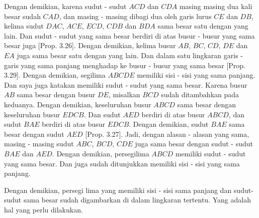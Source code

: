 \documentclass[a4paper]{book}
\begin{document}
Dengan demikian, karena sudut - sudut $ACD$ dan $CDA$ masing masing dua kali
besar  sudah $CAD$, dan masing - masing dibagi dua oleh garis lurus $CE$ dan 
$DB$, kelima sudut $DAC$, $ACE$, $ECD$, $CDB$ dan $BDA$ sama besar satu
dengan yang lain. Dan sudut - sudut yang sama besar berdiri di atas busur -
busur yang sama besar juga [Prop. 3.26]. Dengan demikian, kelima busur $AB$, 
$BC$, $CD$, $DE$ dan $EA$ juga sama besar satu dengan yang lain. Dan dalam 
satu lingkaran garis - garis yang sama panjang menghadap ke busur - busur yang
sama besar [Prop. 3.29].
Dengan demikian, segilima $ABCDE$ memiliki sisi - sisi yang sama panjang. Dan
saya juga katakan memiliki sudut - sudut yang sama besar. Karena busur $AB$ 
sama besar dengan busur $DE$, misalkan $BCD$ sudah ditambahkan pada keduanya.
Dengan demikian, keseluruhan busur $ABCD$ sama besar dengan keseluruhan 
busur $EDCB$.  Dan sudut $AED$ berdiri di atas busur $ABCD$, dan sudut $BAE$
berdiri di atas busur $EDCB$. Dengan demikian, sudut $BAE$ sama besar dengan
sudut $AED$ [Prop. 3.27]. Jadi, dengan alasan - alasan yang sama, masing - 
masing sudut $ABC$, $BCD$, $CDE$ juga sama besar dengan sudut - sudut $BAE$
dan $AED$. Dengan demikian, persegilima $ABCD$ memiliki sudut - sudut yang
sama besar. Dan juga sudah ditunjukkan memiliki sisi - sisi yang sama panjang.

Dengan demikian, persegi lima yang memiliki sisi - sisi sama panjang dan 
sudut- sudut sama besar sudah digambarkan di dalam lingkaran tertentu. Yang
adalah hal yang perlu dilakukan.

\end{document}
